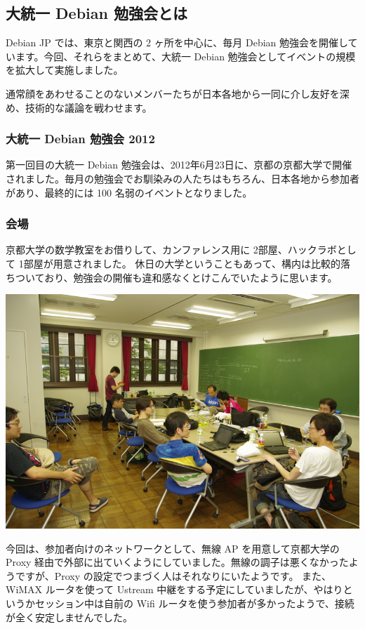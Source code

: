 \documentclass[mingoth,a4paper]{jsarticle}
\begin{document}
\label{sec:gumreportsummary}

\subsection{大統一 Debian 勉強会とは}

Debian JP では、東京と関西の 2 ヶ所を中心に、毎月 Debian 勉強会を開催しています。今回、それらをまとめて、大統一 Debian 勉強会としてイベントの規模を拡大して実施しました。

通常顔をあわせることのないメンバーたちが日本各地から一同に介し友好を深め、技術的な議論を戦わせます。

\subsubsection{大統一 Debian 勉強会 2012}

第一回目の大統一 Debian 勉強会は、2012年6月23日に、京都の京都大学で開催されました。毎月の勉強会でお馴染みの人たちはもちろん、日本各地から参加者があり、最終的には 100 名弱のイベントとなりました。

\subsubsection{会場}

京都大学の数学教室をお借りして、カンファレンス用に 2部屋、ハックラボとして 1部屋が用意されました。
休日の大学ということもあって、構内は比較的落ちついており、勉強会の開催も違和感なくとけこんでいたように思います。

\includegraphics[width=0.8\hsize]{image201206/gum2012-hacklab.jpg}

今回は、参加者向けのネットワークとして、無線 AP を用意して京都大学の Proxy 経由で外部に出ていくようにしていました。無線の調子は悪くなかったようですが、Proxy の設定でつまづく人はそれなりにいたようです。
また、WiMAX ルータを使って Ustream 中継をする予定にしていましたが、やはりというかセッション中は自前の Wifi ルータを使う参加者が多かったようで、接続が全く安定しませんでした。
\end{document}
